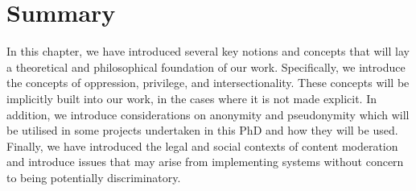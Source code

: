 \cite{Roberts:2019}
\cite{Douglas:1966}
\cite{Lepawsky:2019}



\section{Summary}
In this chapter, we have introduced several key notions and concepts that will lay a theoretical and philosophical foundation of our work. Specifically, we introduce the concepts of oppression, privilege, and intersectionality. These concepts will be implicitly built into our work, in the cases where it is not made explicit. In addition, we introduce considerations on anonymity and pseudonymity which will be utilised in some projects undertaken in this PhD and how they will be used. Finally, we have introduced the legal and social contexts of content moderation and introduce issues that may arise from implementing systems without concern to being potentially discriminatory.
